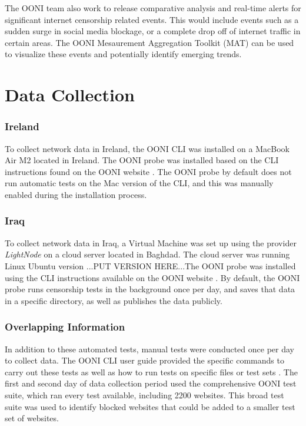 The OONI team also work to release comparative analysis and real-time alerts for significant internet censorship related events. This would include events such as a sudden surge in social media blockage, or a complete drop off of internet traffic in certain areas. The OONI Mesaurement Aggregation Toolkit (MAT) can be used to visualize these events and potentially identify emerging trends. 

\section{Data Collection}

\subsubsection{Ireland}

To collect network data in Ireland, the OONI CLI was installed on a MacBook Air M2 located in Ireland. The OONI probe was installed based on the CLI instructions found on the OONI website \cite{OONISCLI}. The OONI probe by default does not run automatic tests on the Mac version of the CLI, and this was manually enabled during the installation process.

\subsubsection{Iraq}

To collect network data in Iraq, a Virtual Machine was set up using the provider \textit{LightNode} \cite{lightnodeLightNodeGlobal} on a cloud server located in Baghdad. The cloud server was running Linux Ubuntu version ...PUT VERSION HERE...The OONI probe was installed using the CLI instructions available on the OONI website \cite{OONISCLI}. By default, the OONI probe runs censorship tests in the background once per day, and saves that data in a specific directory, as well as publishes the data publicly.

\subsubsection{Overlapping Information}

In addition to these automated tests, manual tests were conducted once per day to collect data. The OONI CLI user guide provided the specific commands to carry out these tests as well as how to run tests on specific files or test sets \cite{ooniUserGuideCLI}. The first and second day of data collection period used the comprehensive OONI test suite, which ran every test available, including 2200 websites. This broad test suite was used to identify blocked websites that could be added to a smaller test set of websites.

